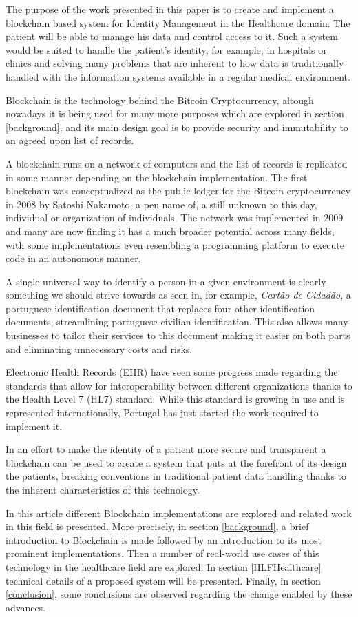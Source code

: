 \documentclass[notitlepage]{llncs}
\begin{document}
The purpose of the work presented in this paper is to create and implement a blockchain based system for Identity Management in the Healthcare domain. The patient will be able to manage his data and control access to it. Such a system would be suited to handle the patient’s identity, for example, in hospitals or clinics and solving many problems that are inherent to how data is traditionally handled with the information systems available in a regular medical environment.
\par
Blockchain is the technology behind the Bitcoin Cryptocurrency, altough nowadays it is being used for many more purposes which are explored in section \ref{background}, and its main design goal is to provide security and immutability to an agreed upon list of records.
\par
A blockchain runs on a network of computers and the list of records is replicated in some manner depending on the blockchain implementation. The first blockchain was conceptualized as the public ledger for the Bitcoin cryptocurrency in 2008 by Satoshi Nakamoto, a pen name of, a still unknown to this day, individual or organization of individuals. The network was implemented in 2009 and many are now finding it has a much broader potential across many fields, with some implementations even resembling a programming platform to execute code in an autonomous manner.
\cite{Nakamoto2008}
\par
A single universal way to identify a person in a given environment is clearly something we should strive towards as seen in, for example, \textit{Cartão de Cidadão}, a portuguese identification document that replaces four other identification documents, streamlining portuguese civilian identification. This also allows many businesses to tailor their services to this document making it easier on both parts and eliminating unnecessary costs and risks.
\par
Electronic Health Records (EHR) have seen some progress made regarding the standards that allow for interoperability between different organizations thanks to the Health Level 7 (HL7) standard. While this standard is growing in use and is represented internationally, Portugal has just started the work required to implement it.
\cite{HealthLevel7}
\par
In an effort to make the identity of a patient more secure and transparent a blockchain can be used to create a system that puts at the forefront of its design the patients, breaking conventions in traditional patient data handling thanks to the inherent characteristics of this technology.
\par
In this article different Blockchain implementations are explored and related work in this field is presented. More precisely, in section \ref{background}, a brief introduction to Blockchain is made followed by an introduction to its most prominent implementations. Then a number of real-world use cases of this technology in the healthcare field are explored. In section \ref{HLFHealthcare} technical details of a proposed system will be presented. Finally, in section \ref{conclusion},  some conclusions are observed regarding the change enabled by these advances.
\end{document}
